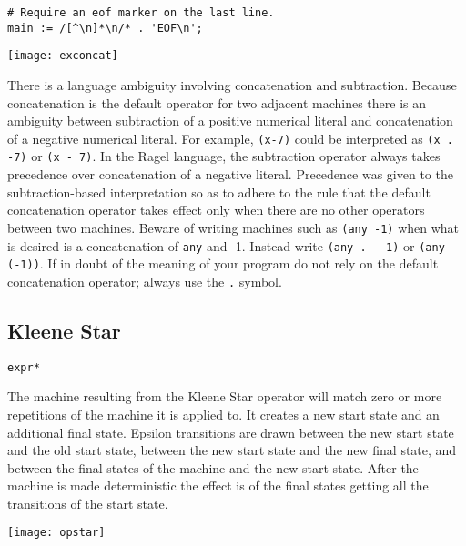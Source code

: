 \documentclass[letterpaper,11pt,oneside]{book}
\newcommand{\verbspace}{\vspace{10pt}}
\newcommand{\graphspace}{\vspace{10pt}}
\newenvironment{inline_code}{\def\baselinestretch{1}\vspace{12pt}\small}{}
\begin{document}
\begin{inline_code}
\begin{verbatim}
# Require an eof marker on the last line.
main := /[^\n]*\n/* . 'EOF\n';
\end{verbatim}
\end{inline_code}

\graphspace
\begin{center}
\texttt{[image: exconcat]}
\end{center}
\graphspace

 There is a language
ambiguity involving concatenation and subtraction. Because concatenation is the 
default operator for two
adjacent machines there is an ambiguity between subtraction of
a positive numerical literal and concatenation of a negative numerical literal.
For example, \verb|(x-7)| could be interpreted as \verb|(x . -7)| or 
\verb|(x - 7)|. In the Ragel language, the subtraction operator always takes precedence
over concatenation of a negative literal. Precedence was given to the
subtraction-based interpretation so as to adhere to the rule that the default
concatenation operator takes effect only when there are no other operators between
two machines. Beware of writing machines such as \verb|(any -1)| when what is
desired is a concatenation of \verb|any| and -1. Instead write 
\verb|(any .  -1)| or \verb|(any (-1))|. If in doubt of the meaning of your program do not
rely on the default concatenation operator; always use the \verb|.| symbol.


\subsection{Kleene Star}

\verb|expr*|
\verbspace

The machine resulting from the Kleene Star operator will match zero or more
repetitions of the machine it is applied to.
It creates a new start state and an additional final
state.  Epsilon transitions are drawn between the new start state and the old start
state, between the new start state and the new final state, and
between the final states of the machine and the new start state.  After the
machine is made deterministic the effect is of the final states getting all the
transitions of the start state. 

\graphspace
\begin{center}
\texttt{[image: opstar]}
\end{center}
\graphspace
\end{document}
